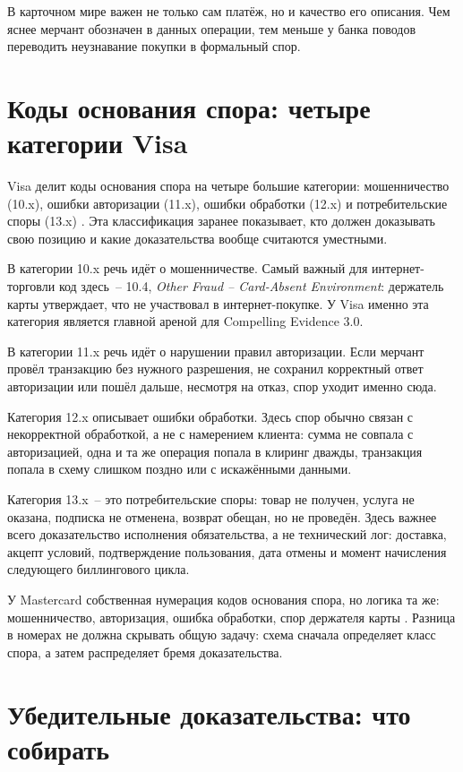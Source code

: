 В карточном мире важен не только сам платёж, но и качество его
описания. Чем яснее мерчант обозначен в данных операции, тем меньше у банка
поводов переводить неузнавание покупки в формальный спор.

\section{Коды основания спора: четыре категории Visa}
\label{sec:disputes-reason-codes}

Visa делит коды основания спора на четыре большие категории:
мошенничество (10.x), ошибки авторизации (11.x), ошибки обработки
(12.x) и потребительские споры (13.x) \cite{visa-dispute-rules}.
Эта классификация заранее показывает, кто должен доказывать свою
позицию и какие доказательства вообще считаются уместными.

В категории 10.x речь идёт о мошенничестве. Самый важный для интернет-торговли
код здесь~-- 10.4, \textit{Other Fraud -- Card-Absent Environment}:
держатель карты утверждает, что не участвовал в интернет-покупке.
У Visa именно эта категория является главной ареной для
Compelling Evidence 3.0.

В категории 11.x речь идёт о нарушении правил авторизации.
Если мерчант провёл транзакцию без нужного разрешения,
не сохранил корректный ответ авторизации или пошёл дальше, несмотря
на отказ, спор уходит именно сюда.

Категория 12.x описывает ошибки обработки. Здесь спор обычно связан
с некорректной обработкой, а не с намерением клиента: сумма не совпала с
авторизацией, одна и та же операция попала в клиринг дважды, транзакция
попала в схему слишком поздно или с искажёнными данными.

Категория 13.x~-- это потребительские споры: товар не получен, услуга
не оказана, подписка не отменена, возврат обещан, но не проведён.
Здесь важнее всего доказательство исполнения обязательства,
а не технический лог: доставка, акцепт условий, подтверждение пользования,
дата отмены и момент начисления следующего биллингового цикла.

У Mastercard собственная нумерация кодов основания спора, но логика
та же: мошенничество, авторизация, ошибка обработки, спор держателя
карты \cite{mc-chargeback-guide}. Разница в номерах не должна
скрывать общую задачу: схема сначала определяет класс спора, а затем
распределяет бремя доказательства.

\section{Убедительные доказательства: что собирать}
\label{sec:disputes-evidence}

